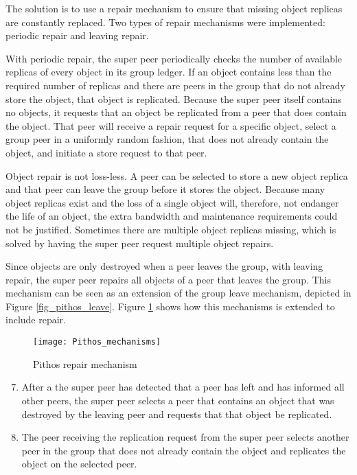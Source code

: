The solution is to use a repair mechanism to ensure that missing object replicas are constantly replaced. Two types of repair mechanisms were implemented: periodic repair and leaving repair.

With periodic repair, the super peer periodically checks the number of available replicas of every object in its group ledger. If an object contains less than the required number of replicas and there are peers in the group that do not already store the object, that object is replicated. Because the super peer itself contains no objects, it requests that an object be replicated from a peer that does contain the object. That peer will receive a repair request for a specific object, select a group peer in a uniformly random fashion, that does not already contain the object, and initiate a store request to that peer.

Object repair is not loss-less. A peer can be selected to store a new object replica and that peer can leave the group before it stores the object. Because many object replicas exist and the loss of a single object will, therefore, not endanger the life of an object, the extra bandwidth and maintenance requirements could not be justified. Sometimes there are multiple object replicas missing, which is solved by having the super peer request multiple object repairs.

Since objects are only destroyed when a peer leaves the group, with leaving repair, the super peer repairs all objects of a peer that leaves the group. This mechanism can be seen as an extension of the group leave mechanism, depicted in Figure \ref{fig_pithos_leave}. Figure \ref{fig_pithos_repair} shows how this mechanisms is extended to include repair.

\begin{figure}[htbp]
 \centering
 \texttt{[image: Pithos\_mechanisms]}
 \caption{Pithos repair mechanism}
 \label{fig_pithos_repair}
\end{figure}
%
\begin{enumerate}
\setcounter{enumi}{6}
\item After a the super peer has detected that a peer has left and has informed all other peers, the super peer selects a peer that contains an object that was destroyed by the leaving peer and requests that that object be replicated.

\item The peer receiving the replication request from the super peer selects another peer in the group that does not already contain the object and replicates the object on the selected peer.
\end{enumerate}

